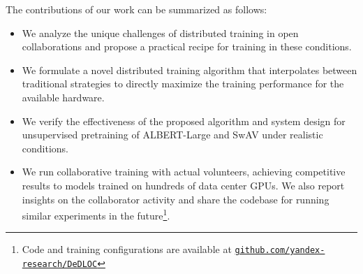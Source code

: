 The contributions of our work can be summarized as follows:

\begin{itemize}[leftmargin=*]
    \item We analyze the unique challenges of distributed training in open collaborations and propose a practical recipe for training in these conditions.
    \item We formulate a novel distributed training algorithm that interpolates between traditional strategies to directly maximize the training performance for the available hardware.
    \item We verify the effectiveness of the proposed algorithm and system design for unsupervised pretraining of ALBERT-Large and SwAV under realistic conditions.
    \item We run collaborative training with actual volunteers, achieving competitive results to models trained on hundreds of data center GPUs. We also report insights on the collaborator activity and share the codebase for running similar experiments in the future\footnote{Code and training configurations are available at \href{https://github.com/yandex-research/DeDLOC}{\texttt{github.com/yandex-research/DeDLOC}}}.
\end{itemize}
